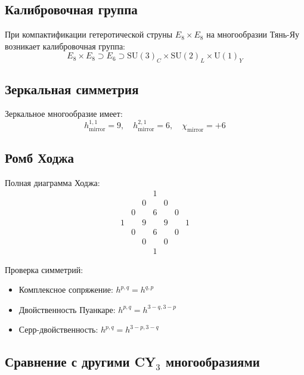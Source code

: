 \documentclass[12pt,a4paper,twoside]{article}
\newcommand{\SU}{\mathrm{SU}}
\newcommand{\Uone}{\mathrm{U}(1)}
\newcommand{\checkmarkgreen}{\textcolor{emerald}{\checkmark}}
\theoremstyle{definition}
\begin{document}
\subsection{Калибровочная группа}

При компактификации гетеротической струны $E_8 \times E_8$ на многообразии Тянь-Яу возникает калибровочная группа:
\begin{equation}
E_8 \times E_8 \supset E_6 \supset \SU(3)_C \times \SU(2)_L \times \Uone_Y
\label{eq:gauge_chain}
\end{equation}

\subsection{Зеркальная симметрия}

Зеркальное многообразие имеет:
\begin{equation}
h^{1,1}_{\text{mirror}} = 9, \quad h^{2,1}_{\text{mirror}} = 6, \quad \chi_{\text{mirror}} = +6
\end{equation}

\subsection{Ромб Ходжа}

Полная диаграмма Ходжа:
\begin{equation}
\begin{matrix}
& & & 1 & & & \\
& & 0 & & 0 & & \\
& 0 & & 6 & & 0 & \\
1 & & 9 & & 9 & & 1 \\
& 0 & & 6 & & 0 & \\
& & 0 & & 0 & & \\
& & & 1 & & &
\end{matrix}
\label{eq:hodge_diamond}
\end{equation}

Проверка симметрий:
\begin{itemize}
    \item Комплексное сопряжение: $h^{p,q} = h^{q,p}$ \checkmarkgreen
    \item Двойственность Пуанкаре: $h^{p,q} = h^{3-q,3-p}$ \checkmarkgreen
    \item Серр-двойственность: $h^{p,q} = h^{3-p,3-q}$ \checkmarkgreen
\end{itemize}

\subsection{Сравнение с другими CY$_3$ многообразиями}
\end{document}
